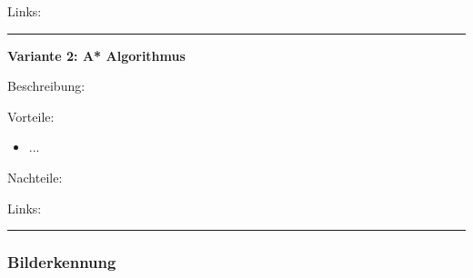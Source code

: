 Links:

\vspace{5pt}
\hrule

\textbf{Variante 2: A* Algorithmus}

Beschreibung:

Vorteile:
\begin{itemize}
    \item ...
\end{itemize}

Nachteile:

Links:

\vspace{5pt}
\hrule




\subsubsection{Bilderkennung}

